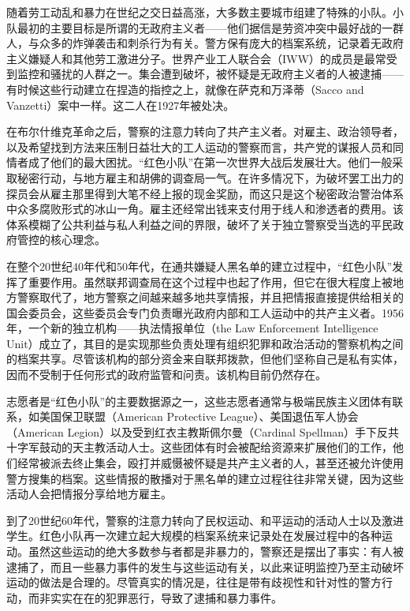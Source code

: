 \documentclass[fontset=fandol, a4paper, 12pt, openright]{ctexbook}
\begin{document}
随着劳工动乱和暴力在世纪之交日益高涨，大多数主要城市组建了特殊的小队。小队最初的主要目标是所谓的无政府主义者——他们据信是劳资冲突中最好战的一群人，与众多的炸弹袭击和刺杀行为有关。警方保有庞大的档案系统，记录着无政府主义嫌疑人和其他劳工激进分子。世界产业工人联合会（IWW）的成员是最常受到监控和骚扰的人群之一。集会遭到破坏，被怀疑是无政府主义者的人被逮捕——有时候这些行动建立在捏造的指控之上，就像在萨克和万泽蒂（Sacco and Vanzetti）案中一样。这二人在1927年被处决。

在布尔什维克革命之后，警察的注意力转向了共产主义者。对雇主、政治领导者，以及希望找到方法来压制日益壮大的工人运动的警察而言，共产党的谋报人员和同情者成了他们的最大困扰。“红色小队”在第一次世界大战后发展壮大。他们一般采取秘密行动，与地方雇主和胡佛的调查局一气。在许多情况下，为破坏罢工出力的探员会从雇主那里得到大笔不经上报的现金奖励，而这只是这个秘密政治警治体系中众多腐败形式的冰山一角。雇主还经常出钱来支付用于线人和渗透者的费用。该体系模糊了公共利益与私人利益之间的界限，破坏了关于独立警察受当选的平民政府管控的核心理念。

在整个20世纪40年代和50年代，在通共嫌疑人黑名单的建立过程中，“红色小队”发挥了重要作用。虽然联邦调查局在这个过程中也起了作用，但它在很大程度上被地方警察取代了，地方警察之间越来越多地共享情报，并且把情报直接提供给相关的国会委员会，这些委员会专门负责曝光政府内部和工人运动中的共产主义者。1956年，一个新的独立机构——执法情报单位（the Law Enforcement Intelligence Unit）成立了，其目的是实现那些负责处理有组织犯罪和政治活动的警察机构之间的档案共享。尽管该机构的部分资金来自联邦拨款，但他们坚称自己是私有实体，因而不受制于任何形式的政府监管和问责。该机构目前仍然存在。

志愿者是“红色小队”的主要数据源之一，这些志愿者通常与极端民族主义团体有联系，如美国保卫联盟（American Protective League）、美国退伍军人协会（American Legion）以及受到红衣主教斯佩尔曼（Cardinal Spellman）手下反共十字军鼓动的天主教活动人士。这些团体有时会被配给资源来扩展他们的工作，他们经常被派去终止集会，殴打并威慑被怀疑是共产主义者的人，甚至还被允许使用警方搜集的档案。这些情报的散播对于黑名单的建立过程往往非常关键，因为这些活动人会把情报分享给地方雇主。

到了20世纪60年代，警察的注意力转向了民权运动、和平运动的活动人士以及激进学生。红色小队再一次建立起大规模的档案系统来记录处在发展过程中的各种运动。虽然这些运动的绝大多数参与者都是非暴力的，警察还是摆出了事实：有人被逮捕了，而且一些暴力事件的发生与这些运动有关，以此来证明监控乃至主动破坏运动的做法是合理的。尽管真实的情况是，往往是带有歧视性和针对性的警方行动，而非实实在在的犯罪恶行，导致了逮捕和暴力事件。
\end{document}
